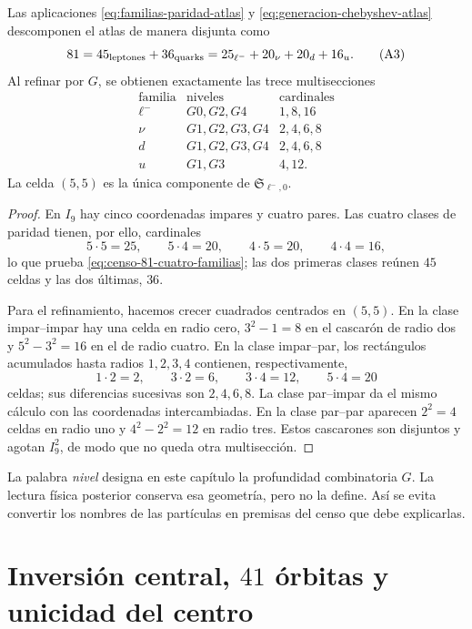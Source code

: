 \begin{theorem}
\label{thm:censo-atlas-81}
Las aplicaciones \eqref{eq:familias-paridad-atlas} y
\eqref{eq:generacion-chebyshev-atlas} descomponen el atlas de manera
disjunta como
\[
 81=45_{\rm leptones}+36_{\rm quarks}
   =25_{\ell^-}+20_{\nu}+20_{d}+16_{u}.
 \tag{A3}\label{eq:censo-81-cuatro-familias}
\]
Al refinar por \(G\), se obtienen exactamente las trece multisecciones
\[
\begin{array}{c|c|c}
\text{familia}&\text{niveles}&\text{cardinales}\\ \hline
\ell^-&G0,G2,G4&1,8,16\\
\nu&G1,G2,G3,G4&2,4,6,8\\
d&G1,G2,G3,G4&2,4,6,8\\
u&G1,G3&4,12.
\end{array}
\tag{A4}\label{eq:trece-multisecciones-atlas}
\]
La celda \((5,5)\) es la única componente de
\(\mathfrak S_{\ell^-,0}\).
\end{theorem}

\begin{proof}
En \(I_9\) hay cinco coordenadas impares y cuatro pares.  Las cuatro clases
de paridad tienen, por ello, cardinales
\[
 5\cdot5=25,\qquad
 5\cdot4=20,\qquad
 4\cdot5=20,\qquad
 4\cdot4=16,
\]
lo que prueba \eqref{eq:censo-81-cuatro-familias}; las dos primeras
clases reúnen \(45\) celdas y las dos últimas, \(36\).

Para el refinamiento, hacemos crecer cuadrados centrados en \((5,5)\).
En la clase impar--impar hay una celda en radio cero, \(3^2-1=8\)
en el cascarón de radio dos y \(5^2-3^2=16\) en el de radio cuatro.
En la clase impar--par, los rectángulos acumulados hasta radios
\(1,2,3,4\) contienen, respectivamente,
\[
 1\cdot2=2,\qquad 3\cdot2=6,\qquad
 3\cdot4=12,\qquad5\cdot4=20
\]
celdas; sus diferencias sucesivas son \(2,4,6,8\).  La clase
par--impar da el mismo cálculo con las coordenadas intercambiadas.  En la
clase par--par aparecen \(2^2=4\) celdas en radio uno y
\(4^2-2^2=12\) en radio tres.  Estos cascarones son disjuntos y agotan
\(I_9^2\), de modo que no queda otra multisección.
\end{proof}

La palabra \emph{nivel} designa en este capítulo la profundidad combinatoria
\(G\).  La lectura física posterior conserva esa geometría, pero no la
define.  Así se evita convertir los nombres de las partículas en premisas
del censo que debe explicarlas.

\section{Inversión central, \(41\) órbitas y unicidad del centro}

